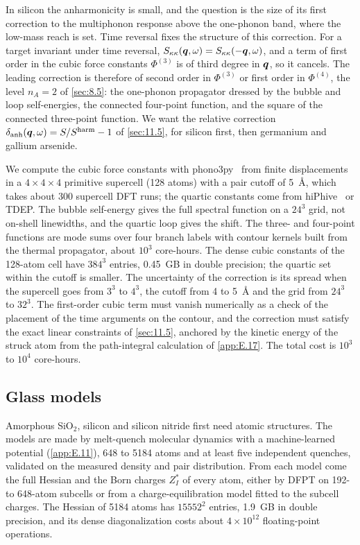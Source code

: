In silicon the anharmonicity is small, and the question is the size of its first correction to the multiphonon response above the one-phonon band, where the low-mass reach is set. Time reversal fixes the structure of this correction. For a target invariant under time reversal, $S_{\kappa\kappa}(\bm{q},\omega) = S_{\kappa\kappa}(-\bm{q},\omega)$, and a term of first order in the cubic force constants $\Phi^{(3)}$ is of third degree in $\bm{q}$, so it cancels. The leading correction is therefore of second order in $\Phi^{(3)}$ or first order in $\Phi^{(4)}$, the level $n_A = 2$ of \cref{sec:8.5}: the one-phonon propagator dressed by the bubble and loop self-energies, the connected four-point function, and the square of the connected three-point function. We want the relative correction $\delta_{\mathrm{anh}}(\bm{q},\omega) = S/S^{\mathrm{harm}} - 1$ of \cref{sec:11.5}, for silicon first, then germanium and gallium arsenide.

We compute the cubic force constants with phono3py~\cite{togo2015distributions} from finite displacements in a $4\times4\times4$ primitive supercell (128 atoms) with a pair cutoff of \SI{5}{\angstrom}, which takes about 300 supercell DFT runs; the quartic constants come from hiPhive~\cite{eriksson2019hiphive} or TDEP. The bubble self-energy gives the full spectral function on a $24^3$ grid, not on-shell linewidths, and the quartic loop gives the shift. The three- and four-point functions are mode sums over four branch labels with contour kernels built from the thermal propagator, about $10^3$ core-hours. The dense cubic constants of the 128-atom cell have $384^3$ entries, \SI{0.45}{GB} in double precision; the quartic set within the cutoff is smaller. The uncertainty of the correction is its spread when the supercell goes from $3^3$ to $4^3$, the cutoff from 4 to \SI{5}{\angstrom} and the grid from $24^3$ to $32^3$. The first-order cubic term must vanish numerically as a check of the placement of the time arguments on the contour, and the correction must satisfy the exact linear constraints of \cref{sec:11.5}, anchored by the kinetic energy of the struck atom from the path-integral calculation of \cref{app:E.17}. The total cost is $10^3$ to $10^4$ core-hours.

\subsection{Glass models}

Amorphous SiO$_2$, silicon and silicon nitride first need atomic structures. The models are made by melt-quench molecular dynamics with a machine-learned potential (\cref{app:E.11}), 648 to 5184 atoms and at least five independent quenches, validated on the measured density and pair distribution. From each model come the full Hessian and the Born charges $Z^*_I$ of every atom, either by DFPT on 192- to 648-atom subcells or from a charge-equilibration model fitted to the subcell charges. The Hessian of 5184 atoms has $15552^2$ entries, \SI{1.9}{GB} in double precision, and its dense diagonalization costs about $4\times10^{12}$ floating-point operations.

